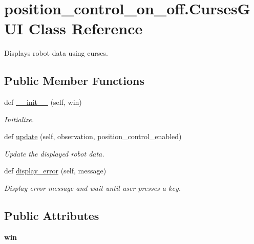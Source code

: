 \hypertarget{classposition__control__on__off_1_1CursesGUI}{}\section{position\+\_\+control\+\_\+on\+\_\+off.\+Curses\+G\+UI Class Reference}
\label{classposition__control__on__off_1_1CursesGUI}


Displays robot data using curses.  


\subsection*{Public Member Functions}
\begin{DoxyCompactItemize}
\item 
def \hyperlink{classposition__control__on__off_1_1CursesGUI_ae9ed34431bd6f151277dbcce612f4ade}{\+\_\+\+\_\+init\+\_\+\+\_\+} (self, win)
\begin{DoxyCompactList}\small\item\em Initialize. \end{DoxyCompactList}\item 
def \hyperlink{classposition__control__on__off_1_1CursesGUI_a793199d55d5ea538b34ddaf6d00b0332}{update} (self, observation, position\+\_\+control\+\_\+enabled)
\begin{DoxyCompactList}\small\item\em Update the displayed robot data. \end{DoxyCompactList}\item 
def \hyperlink{classposition__control__on__off_1_1CursesGUI_ab72e206b4ef8403d82c8a2b21fd8fbaa}{display\+\_\+error} (self, message)
\begin{DoxyCompactList}\small\item\em Display error message and wait until user presses a key. \end{DoxyCompactList}\end{DoxyCompactItemize}
\subsection*{Public Attributes}
\begin{DoxyCompactItemize}
\item 
\mbox{\label{classposition__control__on__off_1_1CursesGUI_a4477456e43374ab3d00a940a134dc350}} 
{\bfseries win}
\end{DoxyCompactItemize}
